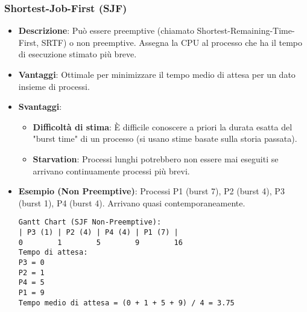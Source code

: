 \subsubsection{Shortest-Job-First (SJF)}
\begin{itemize}
    \item \textbf{Descrizione}: Può essere preemptive (chiamato Shortest-Remaining-Time-First, SRTF) o non preemptive. Assegna la CPU al processo che ha il tempo di esecuzione stimato più breve.
    \item \textbf{Vantaggi}: Ottimale per minimizzare il tempo medio di attesa per un dato insieme di processi.
    \item \textbf{Svantaggi}:
    \begin{itemize}
        \item \textbf{Difficoltà di stima}: È difficile conoscere a priori la durata esatta del "burst time" di un processo (si usano stime basate sulla storia passata).
        \item \textbf{Starvation}: Processi lunghi potrebbero non essere mai eseguiti se arrivano continuamente processi più brevi.
    \end{itemize}
    \item \textbf{Esempio (Non Preemptive)}: Processi P1 (burst 7), P2 (burst 4), P3 (burst 1), P4 (burst 4). Arrivano quasi contemporaneamente.
    \begin{lstlisting}[numbers=none, language=Pseudocode]
Gantt Chart (SJF Non-Preemptive):
| P3 (1) | P2 (4) | P4 (4) | P1 (7) |
0        1        5        9        16
Tempo di attesa:
P3 = 0
P2 = 1
P4 = 5
P1 = 9
Tempo medio di attesa = (0 + 1 + 5 + 9) / 4 = 3.75
    \end{lstlisting}
\end{itemize}

